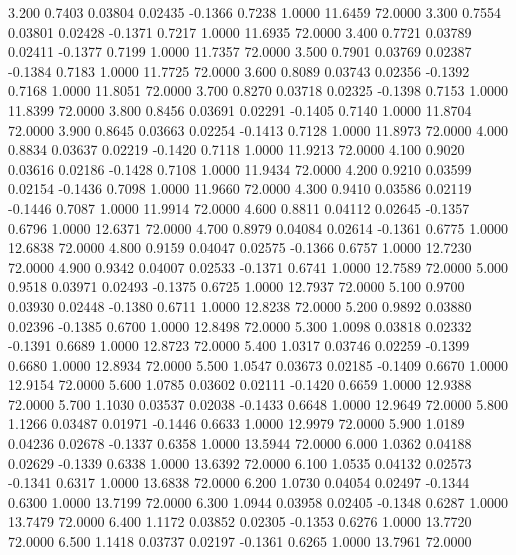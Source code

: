    3.200   0.7403   0.03804   0.02435  -0.1366   0.7238   1.0000  11.6459  72.0000
   3.300   0.7554   0.03801   0.02428  -0.1371   0.7217   1.0000  11.6935  72.0000
   3.400   0.7721   0.03789   0.02411  -0.1377   0.7199   1.0000  11.7357  72.0000
   3.500   0.7901   0.03769   0.02387  -0.1384   0.7183   1.0000  11.7725  72.0000
   3.600   0.8089   0.03743   0.02356  -0.1392   0.7168   1.0000  11.8051  72.0000
   3.700   0.8270   0.03718   0.02325  -0.1398   0.7153   1.0000  11.8399  72.0000
   3.800   0.8456   0.03691   0.02291  -0.1405   0.7140   1.0000  11.8704  72.0000
   3.900   0.8645   0.03663   0.02254  -0.1413   0.7128   1.0000  11.8973  72.0000
   4.000   0.8834   0.03637   0.02219  -0.1420   0.7118   1.0000  11.9213  72.0000
   4.100   0.9020   0.03616   0.02186  -0.1428   0.7108   1.0000  11.9434  72.0000
   4.200   0.9210   0.03599   0.02154  -0.1436   0.7098   1.0000  11.9660  72.0000
   4.300   0.9410   0.03586   0.02119  -0.1446   0.7087   1.0000  11.9914  72.0000
   4.600   0.8811   0.04112   0.02645  -0.1357   0.6796   1.0000  12.6371  72.0000
   4.700   0.8979   0.04084   0.02614  -0.1361   0.6775   1.0000  12.6838  72.0000
   4.800   0.9159   0.04047   0.02575  -0.1366   0.6757   1.0000  12.7230  72.0000
   4.900   0.9342   0.04007   0.02533  -0.1371   0.6741   1.0000  12.7589  72.0000
   5.000   0.9518   0.03971   0.02493  -0.1375   0.6725   1.0000  12.7937  72.0000
   5.100   0.9700   0.03930   0.02448  -0.1380   0.6711   1.0000  12.8238  72.0000
   5.200   0.9892   0.03880   0.02396  -0.1385   0.6700   1.0000  12.8498  72.0000
   5.300   1.0098   0.03818   0.02332  -0.1391   0.6689   1.0000  12.8723  72.0000
   5.400   1.0317   0.03746   0.02259  -0.1399   0.6680   1.0000  12.8934  72.0000
   5.500   1.0547   0.03673   0.02185  -0.1409   0.6670   1.0000  12.9154  72.0000
   5.600   1.0785   0.03602   0.02111  -0.1420   0.6659   1.0000  12.9388  72.0000
   5.700   1.1030   0.03537   0.02038  -0.1433   0.6648   1.0000  12.9649  72.0000
   5.800   1.1266   0.03487   0.01971  -0.1446   0.6633   1.0000  12.9979  72.0000
   5.900   1.0189   0.04236   0.02678  -0.1337   0.6358   1.0000  13.5944  72.0000
   6.000   1.0362   0.04188   0.02629  -0.1339   0.6338   1.0000  13.6392  72.0000
   6.100   1.0535   0.04132   0.02573  -0.1341   0.6317   1.0000  13.6838  72.0000
   6.200   1.0730   0.04054   0.02497  -0.1344   0.6300   1.0000  13.7199  72.0000
   6.300   1.0944   0.03958   0.02405  -0.1348   0.6287   1.0000  13.7479  72.0000
   6.400   1.1172   0.03852   0.02305  -0.1353   0.6276   1.0000  13.7720  72.0000
   6.500   1.1418   0.03737   0.02197  -0.1361   0.6265   1.0000  13.7961  72.0000
